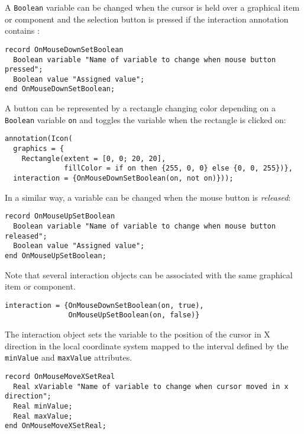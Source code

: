 A \lstinline!Boolean! variable can be changed when the cursor is held over a graphical item or component and the selection button is pressed if the interaction annotation contains :
\begin{lstlisting}[language=modelica]
record OnMouseDownSetBoolean
  Boolean variable "Name of variable to change when mouse button pressed";
  Boolean value "Assigned value";
end OnMouseDownSetBoolean;
\end{lstlisting}

\begin{example}
A button can be represented by a rectangle changing color depending on a \lstinline!Boolean! variable \lstinline!on! and toggles the
variable when the rectangle is clicked on:
\begin{lstlisting}[language=modelica]
annotation(Icon(
  graphics = {
    Rectangle(extent = [0, 0; 20, 20],
              fillColor = if on then {255, 0, 0} else {0, 0, 255})},
  interaction = {OnMouseDownSetBoolean(on, not on)}));
\end{lstlisting}
\end{example}

In a similar way, a variable can be changed when the mouse button is \emph{released}:
\begin{lstlisting}[language=modelica]
record OnMouseUpSetBoolean
  Boolean variable "Name of variable to change when mouse button released";
  Boolean value "Assigned value";
end OnMouseUpSetBoolean;
\end{lstlisting}%

Note that several interaction objects can be associated with the same graphical item or component.
\begin{example}
\begin{lstlisting}[language=modelica]
interaction = {OnMouseDownSetBoolean(on, true),
               OnMouseUpSetBoolean(on, false)}
\end{lstlisting}
\end{example}

The  interaction object sets the variable to the position of the cursor in X direction in the local coordinate system mapped to the interval defined by the \lstinline!minValue! and \lstinline!maxValue! attributes.
\begin{lstlisting}[language=modelica]
record OnMouseMoveXSetReal
  Real xVariable "Name of variable to change when cursor moved in x direction";
  Real minValue;
  Real maxValue;
end OnMouseMoveXSetReal;
\end{lstlisting}

